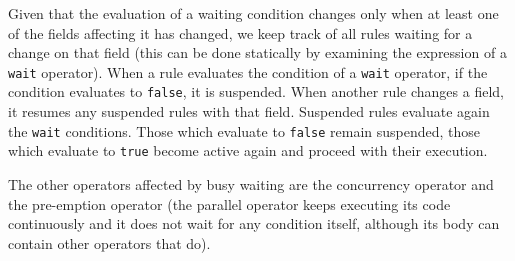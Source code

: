 Given that the evaluation of a waiting condition changes only when at least one of the fields affecting it has changed, we keep track of all rules waiting for a change on that field (this can be done statically by examining the expression of a \texttt{wait} operator). When a rule evaluates the condition of a \texttt{wait} operator, if the condition evaluates to \texttt{false}, it is suspended. When another rule changes a field, it resumes any suspended rules with that field. Suspended rules evaluate again the \texttt{wait} conditions. Those which evaluate to \texttt{false} remain suspended, those which evaluate to \texttt{true} become active again and proceed with their execution.

The other operators affected by busy waiting are the concurrency operator and the pre-emption operator (the parallel operator keeps executing its code continuously and it does not wait for any condition itself, although its body can contain other operators that do).